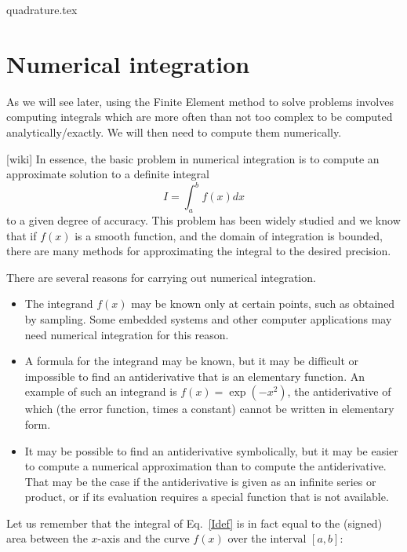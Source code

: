 \begin{flushright} {\tiny {\color{gray} quadrature.tex}} \end{flushright}

\chapter{Numerical integration} \label{sec:quadrature}


As we will see later, using the Finite Element method to solve problems involves 
computing integrals which are more often than not too complex to be computed 
analytically/exactly. We will then need to compute them numerically.

[wiki] In essence, 
the basic problem in numerical integration is to compute an approximate solution to a definite integral
\begin{equation}
I=\int_a^b f(x) dx
\label{Idef}
\end{equation}
to a given degree of accuracy.
This problem has been widely studied and we know that 
if $f(x)$ is a smooth function, and the domain of integration is bounded, 
there are many methods for approximating the integral to the desired precision.

There are several reasons for carrying out numerical integration.
\begin{itemize}
\item The integrand $f(x)$ may be known only at certain points, such as obtained by sampling. 
Some embedded systems and other computer applications may need numerical integration for this reason.
\item A formula for the integrand may be known, but it may be difficult or impossible to 
find an antiderivative that is an elementary function. An example of such an integrand 
is $f(x)=\exp(-x^2)$, the antiderivative of which (the error function, times a constant) 
cannot be written in elementary form.
\item It may be possible to find an antiderivative symbolically, but it may be 
easier to compute a numerical approximation than to compute the antiderivative. That may be the 
case if the antiderivative is given as an infinite series or product, or if its evaluation 
requires a special function that is not available.
\end{itemize}

Let us remember that the integral of Eq.~\eqref{Idef} is in fact equal to the (signed) area 
between the $x$-axis and the curve $f(x)$ over the interval $[a,b]$:

